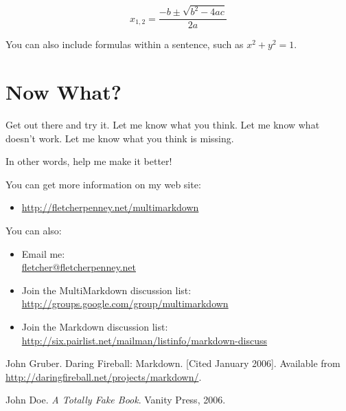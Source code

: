 \documentclass[oneside,article]{memoir}
\def\mybibliostyle{plain}
\def\bibliocommand{}
\begin{document}
\begin{equation}
\label{quadraticequationsolution}
{x}_{1,2}=\frac{-b\pm \sqrt{{b}^{2}-4ac}}{2a}
\end{equation}


You can also include formulas within a sentence, such as
${x}^{2}+{y}^{2}=1$.


\chapter{Now What?}
\label{nowwhat}

Get out there and try it. Let me know what you think. Let me know what doesn't
work. Let me know what you think is missing.


In other words, help me make it better!


You can get more information on my web site:


\begin{itemize}


\item \url{http://fletcherpenney.net/multimarkdown}
\end{itemize}

You can also:


\begin{itemize}


\item Email me: \\\href{mailto:fletcher@fletcherpenney.net}{fletcher@fletcherpenney.net}




\item Join the MultiMarkdown discussion list: \\\url{http://groups.google.com/group/multimarkdown}




\item Join the Markdown discussion list: \\\url{http://six.pairlist.net/mailman/listinfo/markdown-discuss}



\end{itemize}

\begin{thebibliography}{0}


John Gruber.  Daring Fireball: Markdown. [Cited January 2006]. Available from \url{http://daringfireball.net/projects/markdown/}.

John Doe. {\itshape A Totally Fake Book}.  Vanity Press, 2006.
		
\end{thebibliography}
		
%
%

\backmatter


\bibliocommand

\printglossary


\printindex
\end{document}
